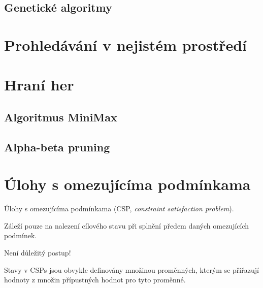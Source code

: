 
\subsection{Genetické algoritmy}



\section{Prohledávání v nejistém prostředí}




\section{Hraní her}


\subsection{Algoritmus MiniMax}


\subsection{Alpha-beta pruning}



\section{Úlohy s omezujícíma podmínkama}

\begin{compactitem}
    \item Úlohy s omezujícíma podmínkama (CSP, \textit{constraint satisfaction problem}).

    \item Záleží pouze na nalezení cílového stavu při splnění předem daných omezujících podmínek.

    \item Není důležitý postup!

    \item Stavy v CSPs jsou obvykle definovány množinou proměnných, kterým se přiřazují hodnoty z množin přípustných hodnot pro tyto proměnné.
\end{compactitem}

